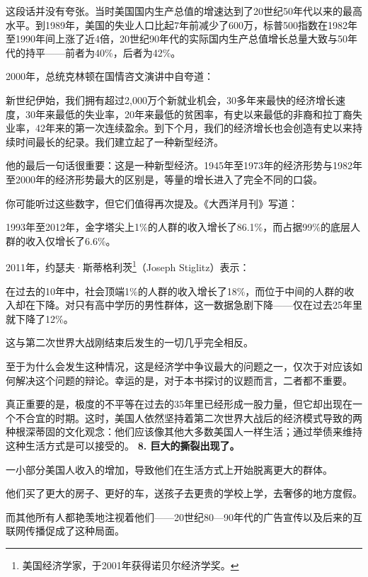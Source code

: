 这段话并没有夸张。当时美国国内生产总值的增速达到了20世纪50年代以来的最高水平。到1989年，美国的失业人口比起7年前减少了600万，标普500指数在1982年至1990年间上涨了近4倍，20世纪90年代的实际国内生产总值增长总量大致与50年代的持平——前者为40\%，后者为42\%。

2000年，总统克林顿在国情咨文演讲中自夸道：

{\kaishu

新世纪伊始，我们拥有超过2,000万个新就业机会，30多年来最快的经济增长速度，30年来最低的失业率，20年来最低的贫困率，有史以来最低的非裔和拉丁裔失业率，42年来的第一次连续盈余。到下个月，我们的经济增长也会创造有史以来持续时间最长的纪录。我们建立起了一种新型经济。

}

他的最后一句话很重要：这是一种新型经济。1945年至1973年的经济形势与1982年至2000年的经济形势最大的区别是，等量的增长进入了完全不同的口袋。

你可能听过这些数字，但它们值得再次提及。《大西洋月刊》写道：

{\kaishu

1993年至2012年，金字塔尖上1\%的人群的收入增长了86.1\%，而占据99\%的底层人群的收入仅增长了6.6\%。

}

2011年，约瑟夫·斯蒂格利茨\footnote{美国经济学家，于2001年获得诺贝尔经济学奖。}（Joseph Stiglitz）表示：

{\kaishu

在过去的10年中，社会顶端1\%的人群的收入增长了18\%，而位于中间的人群的收入却在下降。对只有高中学历的男性群体，这一数据急剧下降——仅在过去25年里就下降了12\%。

}

这与第二次世界大战刚结束后发生的一切几乎完全相反。

至于为什么会发生这种情况，这是经济学中争议最大的问题之一，仅次于对应该如何解决这个问题的辩论。幸运的是，对于本书探讨的议题而言，二者都不重要。

真正重要的是，极度的不平等在过去的35年里已经形成一股力量，但它却出现在一个不合宜的时期。这时，美国人依然坚持着第二次世界大战后的经济模式导致的两种根深蒂固的文化观念：他们应该像其他大多数美国人一样生活；通过举债来维持这种生活方式是可以接受的。
\textbf{8. 巨大的撕裂出现了。}

一小部分美国人收入的增加，导致他们在生活方式上开始脱离更大的群体。

他们买了更大的房子、更好的车，送孩子去更贵的学校上学，去奢侈的地方度假。

而其他所有人都艳羡地注视着他们——20世纪80—90年代的广告宣传以及后来的互联网传播促成了这种局面。

